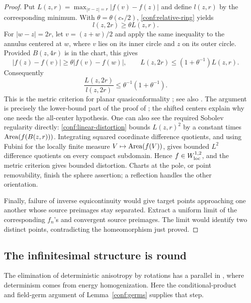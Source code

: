 \begin{proof}
Put \(L(z,r)=\max_{|v-z|=r}|f(v)-f(z)|\) and define
\(l(z,r)\) by the corresponding minimum.  With
\(\theta=\theta(c_*/2)\), \eqref{conf:relative-ring} yields
\[
 l(z,2r)\ge\theta L(z,r).
\]
For \(|w-z|=2r\), let \(v=(z+w)/2\) and apply the same
inequality to the annulus centered at \(w\), where \(v\) lies
on its inner circle and \(z\) on its outer circle.  Provided
\(B(z,4r)\) is in the chart, this gives
\[
 |f(z)-f(v)|\ge\theta|f(v)-f(w)|,
 \qquad
 L(z,2r)\le(1+\theta^{-1})L(z,r).
\]
Consequently
\begin{equation}
 \frac{L(z,2r)}{l(z,2r)}
       \le \theta^{-1}(1+\theta^{-1}).
 \label{conf:linear-distortion}
\end{equation}
This is the metric criterion for planar quasiconformality
\cite[Theorem~1]{Cristea1989Quasiconformality}; see also
\cite[Theorem~2.5.3]{AstalaIwaniecMartin2009}. The
argument is precisely the lower-bound part of the proof of
\cite[Lemma~3.1, equations~(3.3)--(3.7)]{IvriiMarkovic2019}; the
shifted centers explain why one needs the all-center hypothesis.
One can also see the required Sobolev regularity directly:
\eqref{conf:linear-distortion} bounds \(L(z,r)^2\) by a constant
times \(\operatorname{Area}(f(B(z,r)))\).  Integrating squared coordinate
difference quotients, and using Fubini for the locally finite
measure \(V\mapsto\operatorname{Area}(f(V))\), gives bounded \(L^2\)
difference quotients on every compact subdomain.  Hence
\(f\in W^{1,2}_{\rm loc}\), and the metric criterion gives
bounded distortion.  Charts at the pole, or point removability,
finish the sphere assertion; a reflection handles the other
orientation.

Finally, failure of inverse equicontinuity would give target points
approaching one another whose source preimages stay separated.
Extract a uniform limit of the corresponding \(f_n\)'s and
convergent source preimages.  The limit would identify two distinct
points, contradicting the homeomorphism just proved.
\end{proof}

\subsection{The infinitesimal structure is round}
\label{conf:tensor-subsection}

The elimination of deterministic anisotropy by rotations has a parallel
in \cite[Section~4.4]{HoldenYuUniformization}, where determinism comes
from energy homogenization.  Here the conditional-product and field-germ
argument of Lemma~\ref{conf:germs} supplies that step.

